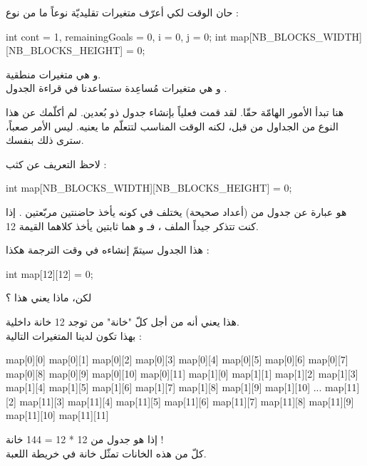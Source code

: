حان الوقت لكي أعرّف متغيرات تقليديّة نوعاً ما من نوع 
 :

\begin{Csource}
int cont = 1, remainingGoals = 0, i = 0, j = 0;
int map[NB_BLOCKS_WIDTH][NB_BLOCKS_HEIGHT] = {0};
\end{Csource}

و 
هي متغيرات منطقية.\\
و
هي متغيرات مُساعِدة ستساعدنا في قراءة الجدول 
.

هنا تبدأ الأمور الهامّة حقّا. لقد قمت فعلياً بإنشاء جدول ذو بُعدين. لم أكلّمك عن هذا النوع من الجداول من قبل، لكنه الوقت المناسب لتتعلّم ما يعنيه. ليس الأمر صعباً، سترى ذلك بنفسك.

لاحظ التعريف عن كثب :

\begin{Csource}
int map[NB_BLOCKS_WIDTH][NB_BLOCKS_HEIGHT] = {0};
\end{Csource}

هو عبارة عن جدول من 
(أعداد صحيحة) يختلف في كونه يأخذ حاضنتين مربّعتين
\InlineCode{[ ]}.
إذا كنت تتذكر جيداً الملف 
،
 فـ
و
هما ثابتين يأخذ كلاهما القيمة 12.

هذا الجدول سيتمّ إنشاءه في وقت الترجمة هكذا :

\begin{Csource}
int map[12][12] = {0};
\end{Csource}

\begin{question}
لكن، ماذا يعني هذا ؟
\end{question}

هذا يعني أنه من أجل كلّ "خانة" من
توجد 12 خانة داخلية.\\
بهذا تكون لدينا المتغيرات التالية :

\begin{Console}
map[0][0]
map[0][1]
map[0][2]
map[0][3]
map[0][4]
map[0][5]
map[0][6]
map[0][7]
map[0][8]
map[0][9]
map[0][10]
map[0][11]
map[1][0]
map[1][1]
map[1][2]
map[1][3]
map[1][4]
map[1][5]
map[1][6]
map[1][7]
map[1][8]
map[1][9]
map[1][10]
...
map[11][2]
map[11][3]
map[11][4]
map[11][5]
map[11][6]
map[11][7]
map[11][8]
map[11][9]
map[11][10]
map[11][11]
\end{Console}

إذا هو جدول من 12 * 12 = 144 خانة !\\
كلّ من هذه الخانات تمثّل خانة في خريطة اللعبة.

